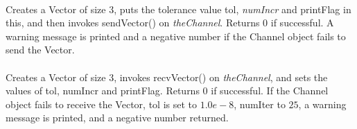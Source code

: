 \\ 
Creates a Vector of size 3, puts the tolerance value \p tol, {\em
numIncr} and \p printFlag
in this, and then invokes sendVector() on {\em
theChannel}. Returns $0$ if successful. A warning message is printed
and a negative number if the Channel object fails to send the Vector.\\ 

\\ 
Creates a Vector of size 3, invokes recvVector() on {\em
theChannel}, and sets the values of \p tol, \p numIncr and \p printFlag.
Returns $0$ if successful. If the Channel object fails to receive the
Vector, \p tol is set to $1.0e-8$, \p numIter to $25$, a warning
message is printed, and a negative number returned.







